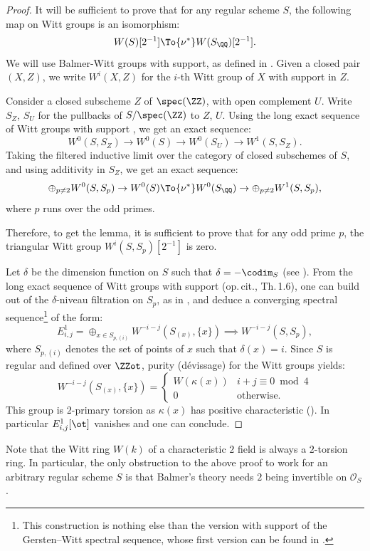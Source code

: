 \begin{proof}
It will be sufficient to prove that for any regular scheme $S$, the following map on Witt groups
is an isomorphism:
\[
W(S)[2^{-1}] \To{\nu^*} W(S_\QQ)[2^{-1}].
\]
We will use Balmer-Witt groups with support, as defined in \cite[\S 1]{BalmerWitt}.
Given a closed pair $(X,Z)$, we write $W^i(X,Z)$ for the $i$-th Witt group of $X$ with support in $Z$.

Consider a closed subscheme $Z$ of $\spec(\ZZ)$, with open complement $U$.
Write $S_Z$, $S_U$ for the pullbacks of $S/\spec(\ZZ)$ to $Z$, $U$.
Using the long exact sequence of Witt groups with support \cite[1.7]{BalmerWitt},
we get an exact sequence:
\[
W^0(S,S_Z) \to W^0(S) \to W^0(S_U) \to W^1(S,S_Z).
\]
Taking the filtered inductive limit over the category of closed subschemes of $S$,
and using additivity in $S_Z$, we get an exact sequence:
\[
\oplus_{p\neq 2} W^0(S,S_p) \to W^0(S) \To{\nu^*} W^0(S_\QQ) \to \oplus_{p\neq 2} W^1(S,S_p),
\]
where $p$ runs over the odd primes.

Therefore, to get the lemma, it is sufficient to prove that for any odd prime $p$,
the triangular Witt group $W^i(S,S_p)[2^{-1}]$ is zero.

Let $\delta$ be the dimension function on $S$ such that $\delta=-\codim_S$
(see \eg \cite[\S 1.1]{BD1}).
From the long exact sequence of Witt groups with support (op.\,cit., Th.\,1.6),
one can build out of the $\delta$-niveau filtration on $S_p$,
as in \cite[\S 3.1]{BD1}, and deduce a converging spectral
sequence\footnote{This construction is nothing else than the version with support of the Gersten--Witt spectral sequence,
whose first version can be found in \cite{BalmerWalter}.} of the form:
\[
E^1_{i,j}=\oplus_{x \in S_{p,(i)}} W^{-i-j}(S_{(x)},\{x\}) \implies W^{-i-j}(S,S_p),
\]
where $S_{p,{(i)}}$ denotes the set of points of $x$ such that $\delta(x)=i$.
Since $S$ is regular and defined over $\ZZot$, purity (dévissage) for the Witt groups \cite[Th.\,6.1]{BalmerWalter} yields:
\[
W^{-i-j}(S_{(x)},\{x\})=
\begin{cases}
W(\kappa(x)) & i+j\equiv 0 \bmod 4 \\
0 & \text{otherwise.}
\end{cases}
\]
This group is $2$-primary torsion as $\kappa(x)$ has positive characteristic
(\cite[VIII\,3.2 \& 6.15]{LamQuadratic}).
In particular $E^1_{i,j}[\ot]$ vanishes and one can conclude.
\end{proof}

\begin{rem}
Note that the Witt ring $W(k)$ of a characteristic $2$ field is always a $2$-torsion ring.
In particular, the only obstruction to the above proof to work for an arbitrary regular scheme $S$
is that Balmer's theory needs $2$ being invertible on $\mathcal O_S$.
\end{rem}

